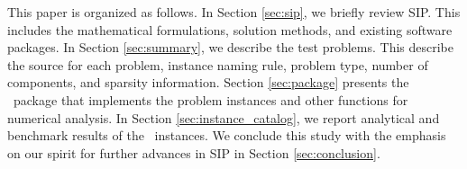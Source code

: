 This paper is organized as follows. In Section \ref{sec:sip}, we briefly review SIP. This 
includes the mathematical formulations, solution methods, and existing software 
packages. In Section \ref{sec:summary}, we describe the test 
problems. This describe the source for each problem, instance naming 
rule, problem type, number of components, and sparsity information. Section \ref{sec:package} presents the \julia\ package that implements the problem instances and other functions for numerical analysis. In Section \ref{sec:instance_catalog}, we report analytical and 
benchmark results of the \smps\ instances. We conclude this study with the 
emphasis on our spirit for further advances in SIP in Section \ref{sec:conclusion}. 







